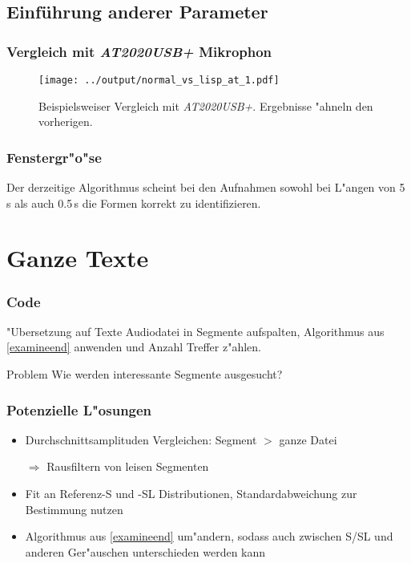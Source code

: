 \documentclass[11pt]{beamer}
\begin{document}
\subsection{Einf\"uhrung anderer Parameter}

\begin{frame}
\frametitle{Vergleich mit \textit{AT2020USB+} Mikrophon}
\begin{figure}
\texttt{[image: ../output/normal\_vs\_lisp\_at\_1.pdf]}
\caption{Beispielsweiser Vergleich mit \textit{AT2020USB+}. Ergebnisse "ahneln den vorherigen.}
\end{figure}
\end{frame}

\begin{frame}
\frametitle{Fenstergr"o"se}
Der derzeitige Algorithmus scheint bei den Aufnahmen sowohl bei L"angen von 5\,s als auch 0.5\,s die Formen korrekt zu identifizieren.
\end{frame}

\section{Ganze Texte}

\begin{frame}
\frametitle{Code}
\begin{exampleblock}{"Ubersetzung auf Texte}
Audiodatei in Segmente aufspalten, Algorithmus aus \ref{examineend} anwenden und Anzahl Treffer z"ahlen.
\end{exampleblock}
\begin{alertblock}{Problem}
Wie werden interessante Segmente ausgesucht?
\end{alertblock}
\end{frame}

\begin{frame}
\frametitle{Potenzielle L"osungen}
\begin{itemize}
\item Durchschnittsamplituden Vergleichen: Segment \(>\) ganze Datei
\item[$\Rightarrow$] Rausfiltern von leisen Segmenten
\item Fit an Referenz-S und -SL Distributionen, Standardabweichung zur Bestimmung nutzen
\item Algorithmus aus \ref{examineend} um"andern, sodass auch zwischen S/SL und anderen Ger"auschen unterschieden werden kann
\end{itemize}
\end{frame}
\end{document}
